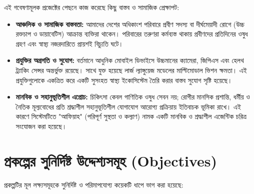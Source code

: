 \documentclass[12pt,a4paper,oneside]{report}
\begin{document}
এই গবেষণামূলক প্রজেক্টের পেছনে কাজ করেছে কিছু বাস্তব ও সামাজিক প্রেক্ষাপট:
\begin{itemize}
    \item \textbf{আঞ্চলিক ও সামাজিক বাস্তবতা:} আমাদের দেশের অধিকাংশ পরিবারে প্রবীণ সদস্য বা দীর্ঘমেয়াদী রোগে (উচ্চ রক্তচাপ ও ডায়াবেটিস) আক্রান্ত ব্যক্তিরা থাকেন। পরিবারের তরুণরা কর্মব্যস্ত থাকায় প্রবীণদের প্রতিদিনের ওষুধ গ্রহণ এবং স্বাস্থ্য নজরদারিতে প্রায়শই বিচ্যুতি ঘটে।
    \item \textbf{প্রযুক্তির অগ্রগতি ও সুযোগ:} বর্তমানে আধুনিক মোবাইল ডিভাইসে উচ্চমানের ক্যামেরা, জিপিএস এবং হেলথ ট্র্যাকিং সেন্সর অন্তর্ভুক্ত রয়েছে। সাথে যুক্ত হয়েছে লার্জ ল্যাঙ্গুয়েজ মডেলের মাল্টিমোডাল ভিশন ক্ষমতা। এই প্রযুক্তিগুলোকে একত্রিত করে একটি সুসংহত স্বাস্থ্য ইকোসিস্টেম তৈরি করার বাস্তব সুযোগ সৃষ্টি হয়েছে।
    \item \textbf{মানবিক ও সহানুভূতিশীল এপ্রোচ:} চিকিৎসা কেবল গাণিতিক ওষুধ সেবন নয়; রোগীর মানসিক প্রশান্তি, ধর্মীয় ও নৈতিক মূল্যবোধের প্রতি শ্রদ্ধাশীল সহানুভূতিশীল যোগাযোগ আরোগ্য প্রক্রিয়ায় ইতিবাচক ভূমিকা রাখে। এই কারণে সিস্টেমটিতে "আফিয়াহ" (পরিপূর্ণ সুস্থতা ও কল্যাণ) নামক একটি মানবিক ও শ্রদ্ধাশীল এজেন্টিক চরিত্র সংযোজন করা হয়েছে।
\end{itemize}

\chapter{প্রকল্পের সুনির্দিষ্ট উদ্দেশ্যসমূহ (Objectives)}

প্রকল্পটির মূল লক্ষ্যসমূহকে সুনির্দিষ্ট ও পরিমাপযোগ্য কয়েকটি ধাপে ভাগ করা হয়েছে:
\end{document}
